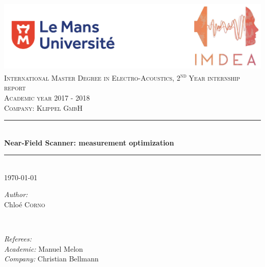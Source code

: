 \documentclass{report}
\newcommand{\ts}{\textsuperscript} 	%
\begin{document}

\begin{titlepage}

\newcommand{\HRule}{\rule{\linewidth}{0.5mm}} %

\center %

\includegraphics[scale=0.4]{logo.png} \\[3cm] %


\textsc{\large International Master Degree in Electro-Acoustics, 2\ts{nd} Year internship report}\\[0.4cm] %
\textsc{\normalsize Academic year 2017 - 2018}\\[0.7cm] %
\textsc{\normalsize Company: Klippel GmbH}\\[0.7cm] %


\HRule \\[0.4cm]
 { \huge \bfseries Near-Field Scanner: measurement optimization}\\[0.3cm] 
\HRule \\[1.5cm]

    
{\large \today}\\[2cm] 


\begin{minipage}{0.4\textwidth}
\begin{flushleft} \large
\emph{Author:}\\ %
Chlo\'{e} \textsc{Corno}

\end{flushleft}
\end{minipage}
~
\begin{minipage}{0.4\textwidth}
\begin{flushright} \large
\emph{Referees:} \\ %
\textit{Academic:} Manuel Melon \\
\textit{Company:} Christian Bellmann \\


\end{flushright}
\end{minipage}\\[2cm]
 
\vfill %

\end{titlepage}
\end{document}

